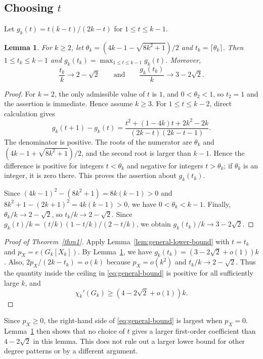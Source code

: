 \documentclass[11pt]{article}
\newtheorem{lemma}[theorem]{Lemma}
\newcommand{\chik}{\chi_k'}
\begin{document}
\subsection{Choosing \texorpdfstring{$t$}{t}}
Let $g_k(t)=t(k-t)/(2k-t)$ for $1\leq t\leq k-1$.

\begin{lemma}\label{lem:choice-t}
For $k\geq2$, let
$\theta_k=(4k-1-\sqrt{8k^2+1})/2$ and
$t_k=\lceil\theta_k\rceil$. Then $1\leq t_k\leq k-1$ and
$g_k(t_k)=\max_{1\leq t\leq k-1}g_k(t)$. Moreover,
\[
\frac{t_k}{k}\longrightarrow2-\sqrt2
\qquad\text{and}\qquad
\frac{g_k(t_k)}{k}\longrightarrow3-2\sqrt2.
\]
\end{lemma}

\begin{proof}
For $k=2$, the only admissible value of $t$ is $1$, and
$0<\theta_2<1$, so $t_2=1$ and the assertion is immediate.
Hence assume $k\geq3$. For
$1\leq t\leq k-2$, direct calculation gives
\[
g_k(t+1)-g_k(t)=
\frac{t^2+(1-4k)t+2k^2-2k}{(2k-t)(2k-t-1)}.
\]
The denominator is positive. The roots of the numerator are $\theta_k$
and $(4k-1+\sqrt{8k^2+1})/2$, and the second root is larger than
$k-1$. Hence the difference is positive for integers $t<\theta_k$ and
negative for integers $t>\theta_k$; if $\theta_k$ is an integer, it is
zero there. This proves the assertion about $g_k(t_k)$.

Since $(4k-1)^2-(8k^2+1)=8k(k-1)>0$ and
$8k^2+1-(2k+1)^2=4k(k-1)>0$, we have $0<\theta_k<k-1$. Finally,
$\theta_k/k\to2-\sqrt2$, so $t_k/k\to2-\sqrt2$. Since
$g_k(t)/k=(t/k)(1-t/k)/(2-t/k)$, we obtain
$g_k(t_k)/k\to3-2\sqrt2$.
\end{proof}

\begin{proof}[Proof of Theorem~\ref{thm1}]
Apply Lemma~\ref{lem:general-lower-bound} with $t=t_k$ and
$p_X=e(G_k[X_k])$. By Lemma~\ref{lem:choice-t}, we have 
$g_k(t_k)=(3-2\sqrt2+o(1))k$. Also,
$2p_X/(2k-t_k)=o(k)$ because $p_X=o(k^2)$ and
$t_k/k\to2-\sqrt2$. Thus the quantity inside the ceiling in
\eqref{eq:general-bound} is positive for all sufficiently large $k$, and
\[
\chik(G_k)\geq(4-2\sqrt2+o(1))k.
\]
\end{proof}

Since $p_X\geq0$, the right-hand side of \eqref{eq:general-bound} is
largest when $p_X=0$. Lemma~\ref{lem:choice-t} then shows that no choice
of $t$ gives a larger first-order coefficient than $4-2\sqrt2$ in this
lemma. This does not rule out a larger lower bound for other degree
patterns or by a different argument.
\end{document}
